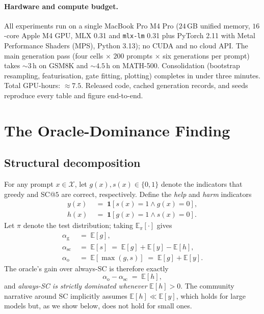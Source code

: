 \documentclass[11pt]{article}
\begin{document}
\paragraph{Hardware and compute budget.}
All experiments run on a single MacBook Pro M4 Pro ($24$\,GB unified
memory, $16$-core Apple M4 GPU, MLX 0.31 and \texttt{mlx-lm} 0.31
plus PyTorch 2.11 with Metal Performance Shaders (MPS), Python
3.13); no CUDA and no cloud API.
The main generation pass (four cells $\times$ $200$ prompts
$\times$ six generations per prompt) takes $\sim 3$\,h on GSM8K and
$\sim 4.5$\,h on MATH-500. Consolidation (bootstrap resampling, featurisation, gate
fitting, plotting) completes in under three minutes. Total
GPU-hours: $\approx 7.5$. Released code, cached generation records,
and seeds reproduce every table and figure end-to-end.

\section{The Oracle-Dominance Finding}
\label{sec:oracle}

\subsection{Structural decomposition}

For any prompt $x\in\mathcal{X}$, let
$g(x),s(x)\in\{0,1\}$ denote the indicators that greedy and SC@$5$
are correct, respectively. Define the \emph{help} and \emph{harm}
indicators
\begin{align*}
y(x) &\;=\; \mathbf{1}[s(x){=}1 \wedge g(x){=}0],\\
h(x) &\;=\; \mathbf{1}[g(x){=}1 \wedge s(x){=}0].
\end{align*}
Let $\pi$ denote the test distribution; taking
$\mathbb{E}_\pi[\cdot]$ gives
\begin{align}
\alpha_\mathrm{g}   &\;=\; \mathbb{E}[g],\\
\alpha_\mathrm{sc}  &\;=\; \mathbb{E}[s] \;=\; \mathbb{E}[g] + \mathbb{E}[y] - \mathbb{E}[h],\\
\alpha_\mathrm{o}   &\;=\; \mathbb{E}[\max(g,s)] \;=\; \mathbb{E}[g] + \mathbb{E}[y].
\end{align}
The oracle's gain over always-SC is therefore exactly
\begin{equation}
\alpha_\mathrm{o} - \alpha_\mathrm{sc} \;=\; \mathbb{E}[h],
\label{eq:oracle-gap}
\end{equation}
and \emph{always-SC is strictly dominated whenever} $\mathbb{E}[h]>0$.
The community narrative around SC implicitly assumes
$\mathbb{E}[h]\ll\mathbb{E}[y]$, which holds for large models but, as
we show below, does not hold for small ones.
\end{document}
